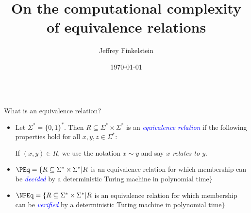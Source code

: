 \documentclass[final]{beamer}
\title{On the computational complexity of equivalence relations}
\author{Jeffrey Finkelstein}
\institute{Tufts University}
\date{\today}
\newcommand{\emphblue}[1]{\emph{\textcolor{blue}{#1}}}
\newcommand{\sigmastar}{\Sigma^*}
\begin{document}
\begin{frame}{} 
  \begin{columns}[t]
    \begin{column}{.3\linewidth}

      \begin{block}{\LARGE What is an equivalence relation?}
        \Large
        \begin{itemize}
        \item Let $\sigmastar=\{0,1\}^*$. Then
          $R\subseteq\sigmastar\times\sigmastar$ is an \emphblue{equivalence
          relation} if the following properties hold for all
          $x,y,z\in\sigmastar$:
          If $(x,y)\in R$, we use the notation $x\sim y$ and say \emph{$x$
            relates to $y$}.
        \item $\PEq=\{R\subseteq\sigmastar\times\sigmastar|R$ is an equivalence
          relation for which membership can be \emphblue{decided} by a
          deterministic Turing machine in polynomial time$\}$
        \item $\NPEq=\{R\subseteq\sigmastar\times\sigmastar|R$ is an
          equivalence relation for which membership can be \emphblue{verified}
          by a deterministic Turing machine in polynomial time$\}$
        \end{itemize}
      \end{block}


\end{column}
\end{columns}
\end{frame}
\end{document}
